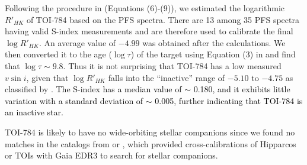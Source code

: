 \documentclass[twocolumn]{aastex631}
\newcommand{\rev}[1]{\textcolor{black}{#1}}
\begin{document}
Following the procedure in \cite{Lehtinen2016} (Equations (6)-(9)), we estimated the logarithmic $R'_{HK}$ of TOI-784 based on the PFS spectra. There are 13 among 35 PFS spectra having valid S-index measurements and are therefore used to calibrate the final $\log R'_{HK}$. An average value of $-4.99$ was obtained after the calculations. We then converted it to the age ($\log \tau$) of the target using Equation (3) in \cite{Mamajek2008} and find that $\log \tau \sim 9.8$. Thus it is not surprising that TOI-784 has a low measured $v\sin{i}$, given that $\log R'_{HK}$ falls into the ``inactive'' range of $-5.10$ to $-4.75$ as classified by \cite{TJHenry1996}. \rev{The S-index has a median value of $\sim$ 0.180, and it exhibits little variation with a standard deviation of $\sim$ 0.005, further indicating that TOI-784 is an inactive star.}

TOI-784 is likely to have no wide-orbiting stellar companions since we found no matches in the catalogs from \cite{Brandt2021} or \cite{Behmard2022}, which provided cross-calibrations of Hipparcos or TOIs with Gaia EDR3 to search for stellar companions.


\end{document}
